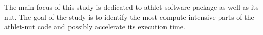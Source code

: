 The main focus of this study is dedicated to \acrfull{athlet} software package as well as its \acrfull{nut}. The goal of the study is to identify the most compute-intensive parts of the \acrshort{athlet}-\acrshort{nut} code and possibly accelerate its execution time.\\

